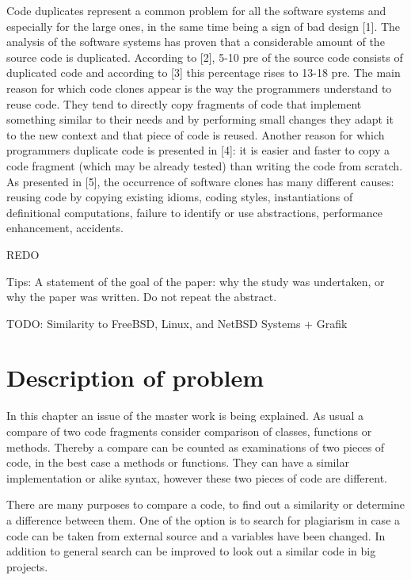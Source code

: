 \documentclass{report}
\begin{document}
Code duplicates represent a common problem for all the
software systems and especially for the large ones, in the
same time being a sign of bad design [1]. The analysis of
the software systems has proven that a considerable
amount of the source code is duplicated. According to [2],
5-10 pre of the source code consists of duplicated code and
according to [3] this percentage rises to 13-18 pre. The main
reason for which code clones appear is the way the
programmers understand to reuse code. They tend to
directly copy fragments of code that implement something
similar to their needs and by performing small changes
they adapt it to the new context and that piece of code is
reused. Another reason for which programmers duplicate
code is presented in [4]: it is easier and faster to copy a
code fragment (which may be already tested) than writing
the code from scratch. As presented in [5], the occurrence
of software clones has many different causes: reusing
code by copying existing idioms, coding styles,
instantiations of definitional computations, failure to
identify or use abstractions, performance enhancement,
accidents.

REDO


Tips:
A statement of the goal of the paper: why the study was undertaken, or why the paper was written. Do not repeat the abstract. 

TODO: Similarity to FreeBSD, Linux, and NetBSD Systems  + Grafik

\newpage	
\chapter{Description of problem}
\label{cha:Description}

In this chapter an issue of the master work is being explained. As usual a compare of two code fragments consider comparison of classes, functions or methods. Thereby a compare can be counted as examinations of two pieces of code, in the best case a methods or functions. They can have a similar implementation or alike syntax, however these two pieces of code are different.

There are many purposes to compare a code, to find out a similarity or determine a difference between them. One of the option is to search for plagiarism in case a code can be taken from external source and a variables have been changed. In addition to general search can be improved to look out a similar code in big projects. 
\end{document}
